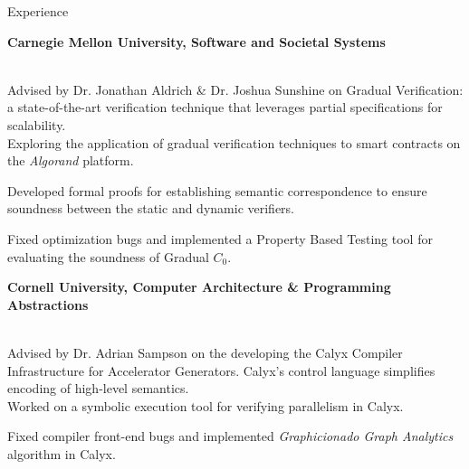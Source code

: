 \begin{rSection}{Experience}

	{\textbf{\large{Carnegie Mellon University, Software and Societal Systems}} \hfill \color{darkgray}{06/2022 - Present} 
	\\ \vspace*{2mm}
	 \hfill \color{darkgray}{Pittsburgh, PA} 
	\\ 
	\color{black}
	\begin{minipage}{40em}
		Advised by Dr. Jonathan Aldrich \& Dr. Joshua Sunshine on Gradual Verification: a state-of-the-art verification technique that leverages partial specifications for scalability. \\
		\color{black}Exploring the application of gradual verification techniques to smart contracts on the \textit{Algorand} platform.

		\color{black}Developed formal proofs for establishing semantic correspondence to ensure soundness between the static and dynamic verifiers.

		\color{black}Fixed optimization bugs and implemented a Property Based Testing tool for evaluating the soundness of Gradual $C_0$.
	\end{minipage}}
	
	\vspace*{2mm}

	{\textbf{\large{Cornell University, Computer Architecture \& Programming Abstractions}} \hfill \color{darkgray}{10/2021 - 12/2022} 
	\\ \vspace*{2mm}
	 \hfill \color{darkgray}{Ithaca, NY}
	\\
	\color{black}
	\begin{minipage}{40em}
		Advised by Dr. Adrian Sampson on the developing the Calyx Compiler Infrastructure for Accelerator Generators. Calyx's control language simplifies encoding of high-level semantics. \\
		\color{black} Worked on a symbolic execution tool for verifying parallelism in Calyx.

		\color{black} Fixed compiler front-end bugs and implemented \textit{Graphicionado Graph Analytics} algorithm in Calyx.
	\end{minipage}} 

	\vspace*{2mm}

\end{rSection} 
